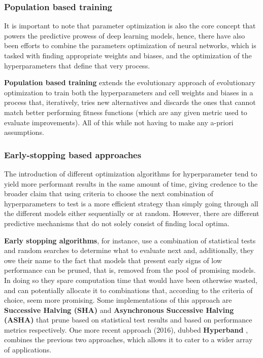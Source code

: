 \subsubsection{Population based training}
It is important to note that parameter optimization is also the core concept that powers the predictive prowess of deep learning models, hence, there have also been efforts to combine the parameters optimization of neural networks, which is tasked with finding appropriate weights and biases, and the optimization of the hyperparameters that define that very process.

\textbf{Population based training} \autocite{DBLP:journals/corr/abs-1902-01894} extends the evolutionary approach of evolutionary optimization to train both the hyperparameters and cell weights and biases in a process that, iteratively, tries new alternatives and discards the ones that cannot match better performing fitness functions (which are any given metric used to evaluate improvements). All of this while not having to make any a-priori assumptions.

\subsubsection{Early-stopping based approaches}
The introduction of different optimization algorithms for hyperparameter tend to yield more performant results in the same amount of time, giving credence to the broader claim that using criteria to choose the next combination of hyperparameters to test is a more efficient strategy than simply going through all the different models either sequentially or at random.
However, there are different predictive mechanisms that do not solely consist of finding local optima. 

\textbf{Early stopping algorithms}, for instance, use a combination of statistical tests and random searches to determine what to evaluate next and, additionally, they owe their name to the fact that models that present early signs of low performance can be pruned, that is, removed from the pool of promising models. In doing so they spare computation time that would have been otherwise wasted, and can potentially allocate it to combinations that, according to the criteria of choice, seem more promising. 
Some implementations of this approach are \textbf{Successive Halving (SHA)} \autocite{DBLP:journals/corr/JamiesonT15} and \textbf{Asynchronous Successive Halving (ASHA)} \autocite{DBLP:journals/corr/abs-1810-05934} that prune based on statistical test results and based on performance metrics respectively. 
One more recent approach (2016), dubbed \textbf{Hyperband} \autocite{DBLP:journals/corr/LiJDRT16}, combines the previous two approaches, which allows it to cater to a wider array of applications.

